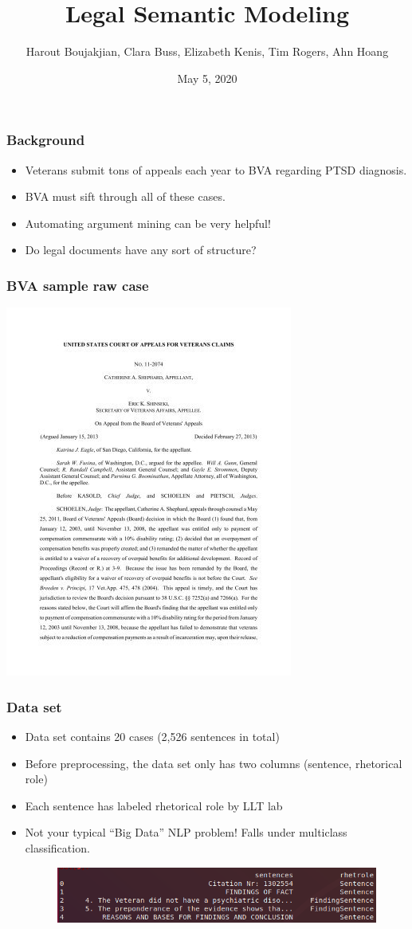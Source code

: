 \documentclass{beamer}
\title{Legal Semantic Modeling}
\date{May 5, 2020}
\author{Harout Boujakjian, Clara Buss, Elizabeth Kenis, Tim Rogers, Ahn Hoang}
\institute{George Mason University}
\begin{document}
\maketitle


\begin{frame}
  \frametitle{Background}
  \footnotesize
  \begin{itemize}
  \item Veterans submit tons of appeals each year to BVA regarding PTSD diagnosis.
  \item BVA must sift through all of these cases.
  \item Automating argument mining can be very helpful!
  \item Do legal documents have any sort of structure?
  \end{itemize}
\end{frame}

\begin{frame}
  \frametitle{BVA sample raw case}
  \centering
  \includegraphics[width=0.6\linewidth]{BVAcase.jpg}
\end{frame}

\begin{frame}
  \frametitle{Data set}
  \begin{itemize}
  \item Data set contains 20 cases (2,526 sentences in total)
  \item Before preprocessing, the data set only has two columns (sentence, rhetorical role)
  \item Each sentence has labeled rhetorical role by LLT lab
  \item Not your typical ``Big Data'' NLP problem! Falls under multiclass classification.
    \begin{figure}
    \includegraphics[width=1\linewidth]{sample_data.png}
    \end{figure}
  \end{itemize}
\end{frame}
\end{document}
